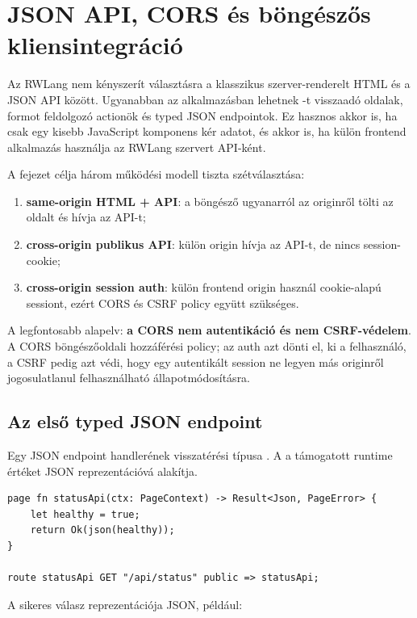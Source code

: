 \chapter{JSON API, CORS és böngészős kliensintegráció}

Az RWLang nem kényszerít választásra a klasszikus szerver-renderelt HTML és a JSON API között. Ugyanabban az alkalmazásban lehetnek -t visszaadó oldalak, formot feldolgozó actionök és typed JSON endpointok. Ez hasznos akkor is, ha csak egy kisebb JavaScript komponens kér adatot, és akkor is, ha külön frontend alkalmazás használja az RWLang szervert API-ként.

A fejezet célja három működési modell tiszta szétválasztása:

\begin{enumerate}
  \item \textbf{same-origin HTML + API}: a böngésző ugyanarról az originről tölti az oldalt és hívja az API-t;
  \item \textbf{cross-origin publikus API}: külön origin hívja az API-t, de nincs session-cookie;
  \item \textbf{cross-origin session auth}: külön frontend origin használ cookie-alapú sessiont, ezért CORS és CSRF policy együtt szükséges.
\end{enumerate}

A legfontosabb alapelv: \textbf{a CORS nem autentikáció és nem CSRF-védelem}. A CORS böngészőoldali hozzáférési policy; az auth azt dönti el, ki a felhasználó, a CSRF pedig azt védi, hogy egy autentikált session ne legyen más originről jogosulatlanul felhasználható állapotmódosításra.

\section{Az első typed JSON endpoint}

Egy JSON endpoint handlerének visszatérési típusa . A  a támogatott runtime értéket JSON reprezentációvá alakítja.

\begin{lstlisting}[language=RWLang]
page fn statusApi(ctx: PageContext) -> Result<Json, PageError> {
    let healthy = true;
    return Ok(json(healthy));
}

route statusApi GET "/api/status" public => statusApi;
\end{lstlisting}

A sikeres válasz reprezentációja JSON, például:


